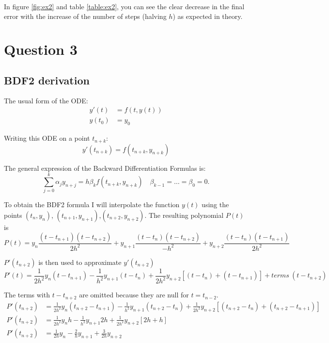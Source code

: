 \documentclass[a4paper, 11pt]{article}
\begin{document}
			In figure \ref{fig:ex2} and table \ref{table:ex2}, you can see the clear decrease in the final error with the increase of the number of steps (halving $h$) as expected in theory.		
		
		\section*{Question 3}
			\subsection*{BDF2 derivation}
			
				The usual form of the ODE:
				\begin{align}
					y'(t) &= f(t, y(t)) \\
					y(t_0) &= y_0
				\end{align}
			
				Writing this ODE on a point $t_{n+k}$:
				\begin{equation}
					y'(t_{n+k}) = f(t_{n+k}, y_{n+k}) 
				\end{equation}
			
				The general expression of the Backward Differentiation Formulas is:
				\begin{equation}
					\sum_{j=0}^{k}\alpha_j y_{n+j} = h \beta_k f(t_{n+k}, y_{n+k}) \quad \beta_{k-1} = \ldots = \beta_0 = 0.
				\end{equation}
			
				To obtain the BDF2 formula I will interpolate the function $y(t)$ using the points $(t_{n}, y_{n})$, $(t_{n+1}, y_{n+1})$,$(t_{n+2}, y_{n+2})$.
				The resulting polynomial $P(t)$ is
				\begin{equation}
					P(t) = y_n \frac{(t - t_{n+1})(t - t_{n+2})}{2h^2} + y_{n+1} \frac{(t - t_n)(t - t_{n+2})}{-h^2} + y_{n+2} \frac{(t - t_n)(t - t_{n+1})}{2h^2}
				\end{equation}
			
				$P'(t_{n+2})$ is then used to approximate $y'(t_{n+2})$
				\begin{equation}
					P'(t) = \frac{1}{2h^2} y_n(t-t_{n+1}) - \frac{1}{h^2} y_{n+1}(t-t_{n}) + \frac{1}{2h^2} y_{n+2}[(t-t_{n})+(t-t_{n+1})] + terms \ (t-t_{n+2})
				\end{equation}
			
				The terms with $t-t_{n+2}$ are omitted because they are null for $t = t_{n-2}$.
				\begin{align}
					P'(t_{n+2}) &= \frac{1}{2h^2} y_n(t_{n+2}-t_{n+1}) - \frac{1}{h^2} y_{n+1}(t_{n+2}-t_{n}) + \frac{1}{2h^2} y_{n+2}[(t_{n+2}-t_{n})+(t_{n+2}-t_{n+1})] \\
					P'(t_{n+2}) &= \frac{1}{2h^2} y_n h - \frac{1}{h^2} y_{n+1} 2h + \frac{1}{2h^2} y_{n+2}[2h+h] \\
					P'(t_{n+2}) &= \frac{1}{2h} y_n - \frac{2}{h} y_{n+1} + \frac{3}{2h} y_{n+2} \\
				\end{align}
			
\end{document}
